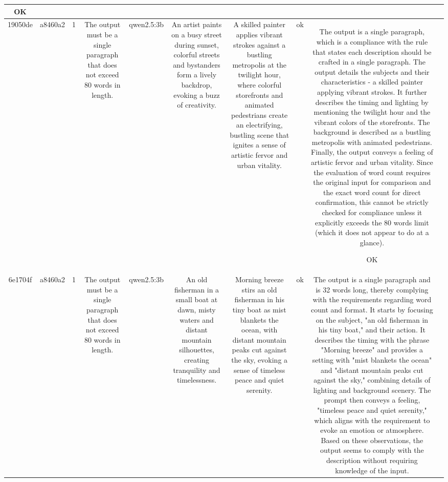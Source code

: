\begin{table}[h!]
\begin{tabular}{|c|c|c|c|c|c|c|c|c|c|}
OK & \\
\hline
19050de & a8460a2 & 1 & The output must be a single paragraph that does not exceed 80 words in length. & qwen2.5:3b & An artist paints on a busy street during sunset, colorful streets and bystanders form a lively backdrop, evoking a buzz of creativity. & A skilled painter applies vibrant strokes against a bustling metropolis at the twilight hour, where colorful storefronts and animated pedestrians create an electrifying, bustling scene that ignites a sense of artistic fervor and urban vitality. & ok & The output is a single paragraph, which is a compliance with the rule that states each description should be crafted in a single paragraph. The output details the subjects and their characteristics - a skilled painter applying vibrant strokes. It further describes the timing and lighting by mentioning the twilight hour and the vibrant colors of the storefronts. The background is described as a bustling metropolis with animated pedestrians. Finally, the output conveys a feeling of artistic fervor and urban vitality. Since the evaluation of word count requires the original input for comparison and the exact word count for direct confirmation, this cannot be strictly checked for compliance unless it explicitly exceeds the 80 words limit (which it does not appear to do at a glance).

OK & \\
\hline
6e1704f & a8460a2 & 1 & The output must be a single paragraph that does not exceed 80 words in length. & qwen2.5:3b & An old fisherman in a small boat at dawn, misty waters and distant mountain silhouettes, creating tranquility and timelessness. & Morning breeze stirs an old fisherman in his tiny boat as mist blankets the ocean, with distant mountain peaks cut against the sky, evoking a sense of timeless peace and quiet serenity. & ok & The output is a single paragraph and is 32 words long, thereby complying with the requirements regarding word count and format. It starts by focusing on the subject, "an old fisherman in his tiny boat," and their action. It describes the timing with the phrase "Morning breeze" and provides a setting with "mist blankets the ocean" and "distant mountain peaks cut against the sky," combining details of lighting and background scenery. The prompt then conveys a feeling, "timeless peace and quiet serenity," which aligns with the requirement to evoke an emotion or atmosphere. Based on these observations, the output seems to comply with the description without requiring knowledge of the input.


\end{tabular}
\end{table}

